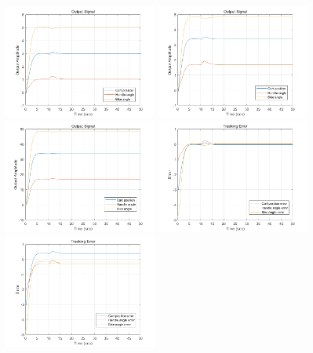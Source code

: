 \documentclass[hyperref]{article}
\theoremstyle{nonumberplain}
\begin{document}
	\begin{figure}[H]
		\centering
		\begin{minipage}[t]{0.3\textwidth}
			\centering
			\includegraphics[width=5cm]{fig52.png}
		\end{minipage}
		\begin{minipage}[t]{0.3\textwidth}
			\centering
			\includegraphics[width=5cm]{fig54.png}
		\end{minipage}
		\begin{minipage}[t]{0.3\textwidth}
			\centering
			\includegraphics[width=5cm]{fig56.png}
		\end{minipage}
		\begin{minipage}[t]{0.3\textwidth}
			\centering
			\includegraphics[width=5cm]{fig53.png}
		\end{minipage}
		\begin{minipage}[t]{0.3\textwidth}
			\centering
			\includegraphics[width=5cm]{fig55.png}

\end{minipage}
\end{figure}
\end{document}
